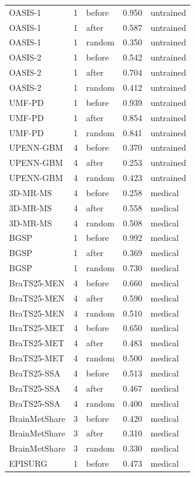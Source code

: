 \begin{tabular}{lrlrl}
OASIS-1 & 1 & before & 0.950 & untrained \\
OASIS-1 & 1 & after & 0.587 & untrained \\
OASIS-1 & 1 & random & 0.350 & untrained \\
OASIS-2 & 1 & before & 0.542 & untrained \\
OASIS-2 & 1 & after & 0.704 & untrained \\
OASIS-2 & 1 & random & 0.412 & untrained \\
UMF-PD & 1 & before & 0.939 & untrained \\
UMF-PD & 1 & after & 0.854 & untrained \\
UMF-PD & 1 & random & 0.841 & untrained \\
UPENN-GBM & 4 & before & 0.370 & untrained \\
UPENN-GBM & 4 & after & 0.253 & untrained \\
UPENN-GBM & 4 & random & 0.423 & untrained \\
3D-MR-MS & 4 & before & 0.258 & medical \\
3D-MR-MS & 4 & after & 0.558 & medical \\
3D-MR-MS & 4 & random & 0.508 & medical \\
BGSP & 1 & before & 0.992 & medical \\
BGSP & 1 & after & 0.369 & medical \\
BGSP & 1 & random & 0.730 & medical \\
BraTS25-MEN & 4 & before & 0.660 & medical \\
BraTS25-MEN & 4 & after & 0.590 & medical \\
BraTS25-MEN & 4 & random & 0.510 & medical \\
BraTS25-MET & 4 & before & 0.650 & medical \\
BraTS25-MET & 4 & after & 0.483 & medical \\
BraTS25-MET & 4 & random & 0.500 & medical \\
BraTS25-SSA & 4 & before & 0.513 & medical \\
BraTS25-SSA & 4 & after & 0.467 & medical \\
BraTS25-SSA & 4 & random & 0.400 & medical \\
BrainMetShare & 3 & before & 0.420 & medical \\
BrainMetShare & 3 & after & 0.310 & medical \\
BrainMetShare & 3 & random & 0.330 & medical \\
EPISURG & 1 & before & 0.473 & medical \\

\end{tabular}
